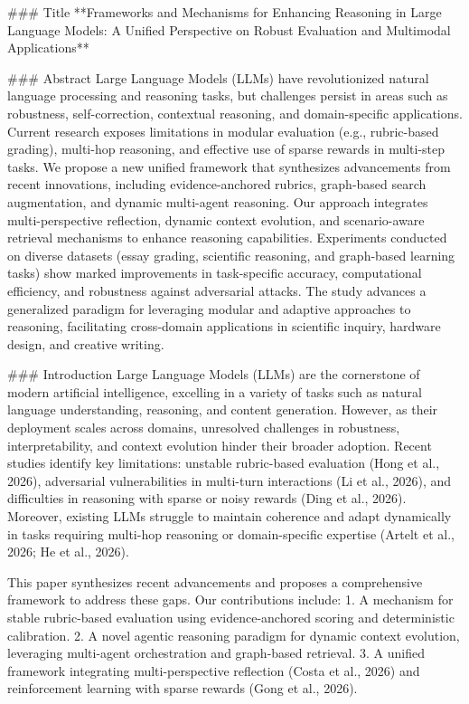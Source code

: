 ### Title  
**Frameworks and Mechanisms for Enhancing Reasoning in Large Language Models: A Unified Perspective on Robust Evaluation and Multimodal Applications**

### Abstract  
Large Language Models (LLMs) have revolutionized natural language processing and reasoning tasks, but challenges persist in areas such as robustness, self-correction, contextual reasoning, and domain-specific applications. Current research exposes limitations in modular evaluation (e.g., rubric-based grading), multi-hop reasoning, and effective use of sparse rewards in multi-step tasks. We propose a new unified framework that synthesizes advancements from recent innovations, including evidence-anchored rubrics, graph-based search augmentation, and dynamic multi-agent reasoning. Our approach integrates multi-perspective reflection, dynamic context evolution, and scenario-aware retrieval mechanisms to enhance reasoning capabilities. Experiments conducted on diverse datasets (essay grading, scientific reasoning, and graph-based learning tasks) show marked improvements in task-specific accuracy, computational efficiency, and robustness against adversarial attacks. The study advances a generalized paradigm for leveraging modular and adaptive approaches to reasoning, facilitating cross-domain applications in scientific inquiry, hardware design, and creative writing. 

### Introduction  
Large Language Models (LLMs) are the cornerstone of modern artificial intelligence, excelling in a variety of tasks such as natural language understanding, reasoning, and content generation. However, as their deployment scales across domains, unresolved challenges in robustness, interpretability, and context evolution hinder their broader adoption. Recent studies identify key limitations: unstable rubric-based evaluation (Hong et al., 2026), adversarial vulnerabilities in multi-turn interactions (Li et al., 2026), and difficulties in reasoning with sparse or noisy rewards (Ding et al., 2026). Moreover, existing LLMs struggle to maintain coherence and adapt dynamically in tasks requiring multi-hop reasoning or domain-specific expertise (Artelt et al., 2026; He et al., 2026).  

This paper synthesizes recent advancements and proposes a comprehensive framework to address these gaps. Our contributions include:  
1. A mechanism for stable rubric-based evaluation using evidence-anchored scoring and deterministic calibration.  
2. A novel agentic reasoning paradigm for dynamic context evolution, leveraging multi-agent orchestration and graph-based retrieval.  
3. A unified framework integrating multi-perspective reflection (Costa et al., 2026) and reinforcement learning with sparse rewards (Gong et al., 2026).  

